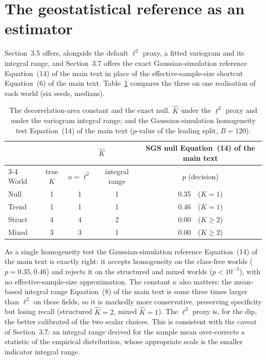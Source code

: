 \documentclass[11pt]{article}
\begin{document}
\section{The geostatistical reference as an estimator}\label{sec:supp-geo}

Section~3.5 offers, alongside the default $\ell^{2}$ proxy, a
fitted variogram and its integral range, and Section~3.7 offers the
exact
Gaussian-simulation reference Equation~(14) of the main text in place of the
effective-sample-size shortcut Equation~(6) of the main text. Table~\ref{tab:supp-geostat}
compares the three on one realisation of each world (six seeds, medians).

\begin{table}[t]
\centering
\caption{The decorrelation-area constant and the exact null. $\hat K$ under the
$\ell^2$ proxy and under the variogram integral range; and the
Gaussian-simulation homogeneity test Equation~(14) of the main text ($p$-value of the
leading split, $B=120$).}
\label{tab:supp-geostat}
\begin{tabular}{l c cc c}
\toprule
 & & \multicolumn{2}{c}{$\hat K$} & SGS null Equation~(14) of the main text\\
\cmidrule(lr){3-4}
World & true $K$ & $a=\ell^2$ & integral range & $p$ (decision)\\
\midrule
Null    & 1 & 1 & 1 & 0.35\ \ ($K{=}1$)\\
Trend   & 1 & 1 & 1 & 0.46\ \ ($K{=}1$)\\
Struct  & 4 & 4 & 2 & 0.00\ \ ($K{\ge}2$)\\
Mixed   & 3 & 3 & 1 & 0.00\ \ ($K{\ge}2$)\\
\bottomrule
\end{tabular}
\end{table}

As a single homogeneity test the Gaussian-simulation reference
Equation~(14) of the main text is exactly right: it accepts homogeneity on the class-free
worlds ($p=0.35,0.46$) and rejects it on the structured and mixed worlds
($p<10^{-3}$), with no effective-sample-size approximation. The constant
$\kappa$ also matters: the mean-based integral range Equation~(8) of the main text is some
three times larger than $\ell^2$ on these fields, so it is markedly more
conservative, preserving specificity but losing recall (structured $\hat K=2$,
mixed $\hat K=1$). The $\ell^2$ proxy is, for the dip, the better calibrated
of the two scalar choices. This is consistent with the caveat of
Section~3.7: an integral range derived for the sample mean
over-corrects a statistic of the empirical distribution, whose appropriate scale
is the smaller indicator integral range.
\end{document}
